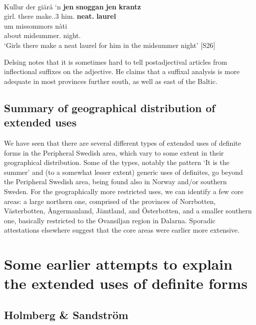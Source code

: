 \ea \label{} 
\\
\gll Kullur  der  giärå  ‘n  \textbf{jen} \textbf{snoggan} \textbf{jen} \textbf{krantz}\\
girl.{\pl}  there  make.{\prs}.3{\pl}  him.{\dat}  \textbf{{\indf}} \textbf{neat.{\acc}} \textbf{{\pia}} \textbf{laurel}\\
\gll um  missommors  nåti\\
about  midsummer.{\gen}  night.{\dat}\\
\glt ‘Girls there make a neat laurel for him in the midsummer night’ [S26]

\z

Delsing notes that it is sometimes hard to tell postadjectival articles from inflectional suffixes on the adjective. He claims that a suffixal analysis is more adequate in most provinces further south, as well as east of the Baltic. 

\subsection{ Summary of geographical distribution of extended uses}

We have seen that there are several different types of extended uses of definite forms in the Peripheral Swedish area, which vary to some extent in their geographical distribution. Some of the types, notably the pattern  ‘It is the summer’  and (to a somewhat lesser extent) generic uses of definites, go beyond the Peripheral Swedish area, being found also in Norway and/or southern Sweden. For the geographically more restricted uses, we can identify a few core areas: a large northern one, comprised of the provinces of Norrbotten, Västerbotten, Ångermanland, Jämtland, and Österbotten, and a smaller southern one, basically restricted to the Ovansiljan region in Dalarna. Sporadic attestations elsewhere suggest that the core areas were earlier more extensive.

\section{ Some earlier attempts to explain the extended uses of definite forms}
\subsection{ Holmberg \& Sandström}

